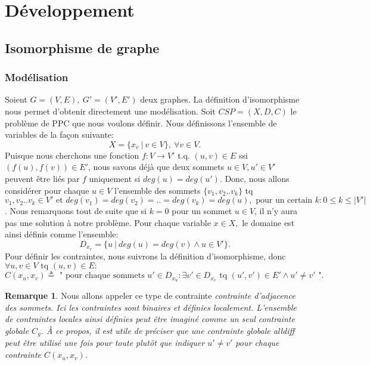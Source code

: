 \documentclass[french]{article}
\theoremstyle{definition}
\newtheorem{rem}{Remarque}[section]
\theoremstyle{remark}
\begin{document}
\newpage
\section{Développement}
\label{sec:Développement}
\subsection{Isomorphisme de graphe}
\subsubsection{Modélisation}
Soient $G=(V, E),\ G'=(V', E')$ deux graphes. 
La définition d'isomorphisme nous permet d'obtenir directement une modélisation. Soit $CSP = (X, D, C)$ le problème de PPC que nous voulons définir. Nous définissons l'ensemble de variables de la façon suivante: 
$$X=\{x_v\ |\ v \in V \},\ \forall v \in V.$$
Puisque nous cherchons une fonction  $f: V \rightarrow V'$ t.q. $ (u,v) \in E$ ssi $ (f(u), f(v)) \in E'$, nous savons déjà que deux sommets $u \in V, u' \in V'$ peuvent être liés par $f$ uniquement si $deg(u) = deg(u')$. Donc, nous allons considérer pour chaque $u \in V$ l'ensemble des sommets $\{v_1, v_2..v_k\}$ tq $v_1, v_2..v_k \in V' \text{ et } deg(v_1)=deg(v_2)=..=deg(v_k)=deg(u), \text{ pour un certain } k: 0 \leq k \leq |V'|$. Nous remarquons tout de suite que si $k=0$ pour un sommet $u \in V$, il n'y aura pas une solution à notre problème. Pour chaque variable $x \in X,$ le domaine est ainsi définis comme l'ensemble: 
$$D_{x_v}=\{u\ |\ deg(u) = deg(v) \land u \in V'\}.$$
Pour définir les contraintes, nous suivrons la définition d'isomorphisme, donc $\forall u, v \in V \text{ tq } (u,v) \in E:$
$$C(x_u, x_v) \triangleq \text{ " pour chaque sommets } u' \in D_{x_u}: \exists v' \in D_{x_v} \text{ tq } (u', v') \in E' \land u' \neq v' \text{ "}.$$
\begin{rem}
	\label{rem:contraintes}
	Nous allons appeler ce type de contrainte \it contrainte d'adjacence des sommets\rm. Ici les contraintes sont binaires et définies localement. L'ensemble de contraintes locales ainsi définies peut être imaginé comme un seul contrainte globale $C_g$. À ce propos, il est utile de préciser que une contrainte globale \it alldiff \rm peut être utilisé une fois pour toute plutôt que indiquer $u' \neq v'$ pour chaque contrainte $C(x_u, x_v)$.
\end{rem}
\end{document}
